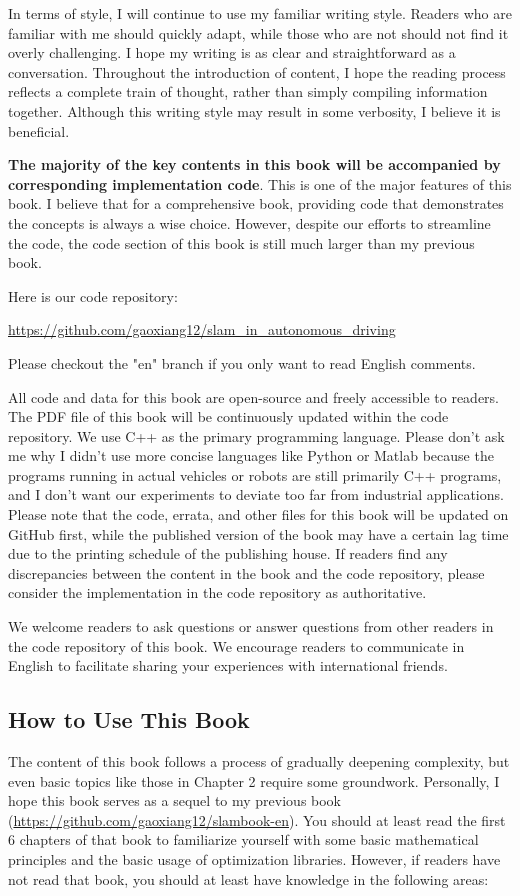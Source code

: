 In terms of style, I will continue to use my familiar writing style. Readers who are familiar with me should quickly adapt, while those who are not should not find it overly challenging. I hope my writing is as clear and straightforward as a conversation. Throughout the introduction of content, I hope the reading process reflects a complete train of thought, rather than simply compiling information together. Although this writing style may result in some verbosity, I believe it is beneficial.

\textbf{The majority of the key contents in this book will be accompanied by corresponding implementation code}. This is one of the major features of this book. I believe that for a comprehensive book, providing code that demonstrates the concepts is always a wise choice. However, despite our efforts to streamline the code, the code section of this book is still much larger than my previous book.

Here is our code repository:

\begin{mdframed}
	\centering
	\url{https://github.com/gaoxiang12/slam_in_autonomous_driving}
\end{mdframed}

Please checkout the "en" branch if you only want to read English comments.

All code and data for this book are open-source and freely accessible to readers. The PDF file of this book will be continuously updated within the code repository. We use C++ as the primary programming language. Please don't ask me why I didn't use more concise languages like Python or Matlab because the programs running in actual vehicles or robots are still primarily C++ programs, and I don't want our experiments to deviate too far from industrial applications. Please note that the code, errata, and other files for this book will be updated on GitHub first, while the published version of the book may have a certain lag time due to the printing schedule of the publishing house. If readers find any discrepancies between the content in the book and the code repository, please consider the implementation in the code repository as authoritative.

We welcome readers to ask questions or answer questions from other readers in the code repository of this book. We encourage readers to communicate in English to facilitate sharing your experiences with international friends.

\subsection*{How to Use This Book}
The content of this book follows a process of gradually deepening complexity, but even basic topics like those in Chapter 2 require some groundwork. Personally, I hope this book serves as a sequel to my previous book \cite{Gao2017} (\url{https://github.com/gaoxiang12/slambook-en}). You should at least read the first 6 chapters of that book to familiarize yourself with some basic mathematical principles and the basic usage of optimization libraries. However, if readers have not read that book, you should at least have knowledge in the following areas:

